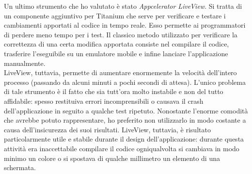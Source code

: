 				Un ultimo strumento che ho valutato è stato \emph{Appcelerator LiveView}. Si tratta di un componente aggiuntivo per
				Titanium che serve per verificare e testare i cambiamenti apportati al codice in tempo reale. Esso permette ai
				programmatori di perdere meno tempo per i test. Il classico metodo utilizzato per verificare la correttezza
				di una certa modifica apportata consiste nel compilare il codice, trasferire l'eseguibile su un emulatore mobile e
				infine lanciare l'applicazione manualmente.\\
				
				\noindent LiveView, tuttavia, permette di aumentare enormemente la velocità dell'intero processo (passando da alcuni minuti a
				pochi secondi di attesa). L'unico problema di tale strumento è il fatto che sia tutt'ora molto instabile e non del
				tutto affidabile: spesso restituiva errori incomprensibili o causava il crash dell'applicazione in seguito a qualche
				test ripetuto. Nonostante l'enorme comodità che avrebbe potuto rappresentare, ho preferito non utilizzarlo in modo
				costante a causa dell'insicurezza dei suoi risultati. LiveView, tuttavia, è risultato particolarmente utile e stabile
				durante il design dell'applicazione: durante questa attività era inaccettabile compilare il codice ogniqualvolta
				si cambiava in modo minimo un colore o si spostava di qualche millimetro un elemento di una schermata.
